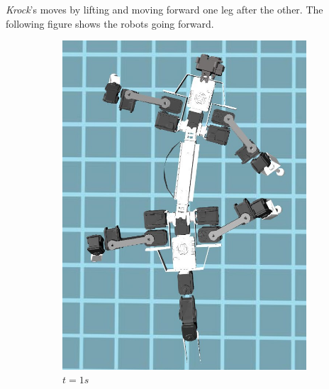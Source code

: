\documentclass[../document.tex]{subfiles}
\begin{document}
\emph{Krock}'s moves by lifting and moving forward one leg after the other. The following figure shows the robots going forward.
    \begin{figure}[htbp]
\centering
        \begin{subfigure}[b]{0.3\textwidth}
            \includegraphics[width=\textwidth]{../img/krock-moving-1}
            \caption{$t=1s$}
        \end{subfigure}
        \begin{subfigure}[b]{0.3\textwidth}

\end{subfigure}
\end{figure}
\end{document}
